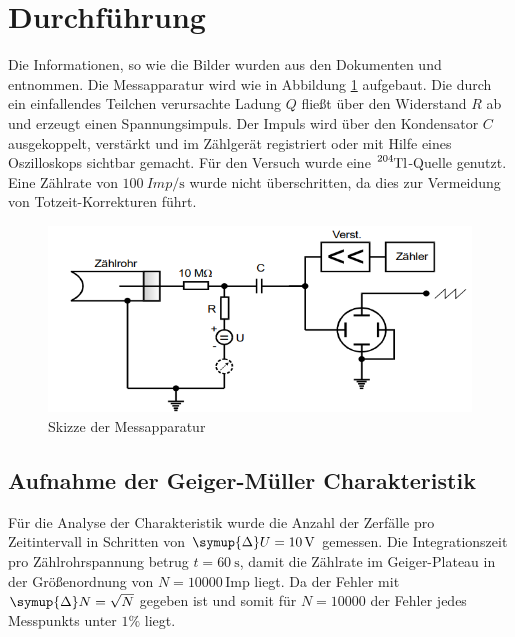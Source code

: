 \section{Durchführung}
\label{sec:Durchführung}
Die Informationen, so wie die Bilder wurden aus den Dokumenten \cite{hin} und \cite{v703} entnommen.
Die Messapparatur wird wie in Abbildung \ref{fig:Schalt} aufgebaut.
Die durch ein einfallendes Teilchen verursachte Ladung $Q$ fließt über den Widerstand $R$ ab und erzeugt einen Spannungsimpuls.
Der Impuls wird über den Kondensator $C$ ausgekoppelt, verstärkt und im Zählgerät registriert oder mit Hilfe eines Oszilloskops sichtbar gemacht.
Für den Versuch wurde eine $\ce{^{204}Tl}$-Quelle genutzt.
Eine Zählrate von $\SI{100}{Imp \per \second}$ wurde nicht überschritten, da dies zur Vermeidung von Totzeit-Korrekturen führt.
\begin{figure}
    \centering
    \includegraphics[scale=0.6]{pics/Schalt.png}
    \caption{Skizze der Messapparatur}
    \label{fig:Schalt}
  \end{figure}
\subsection{Aufnahme der Geiger-Müller Charakteristik}
\label{char}
Für die Analyse der Charakteristik wurde die Anzahl der Zerfälle pro Zeitintervall in Schritten von $\symup{\Delta}U=\SI{10}{\volt}$ gemessen.
Die Integrationszeit pro Zählrohrspannung betrug $t=\SI{60}{\second}$, damit die Zählrate im Geiger-Plateau in der Größenordnung von $N=10000\,  \text{Imp}$ liegt.
Da der Fehler mit $\symup{\Delta}N=\sqrt{N}$ gegeben ist und somit für $N=10000$ der Fehler jedes Messpunkts unter $1\% $ liegt.
